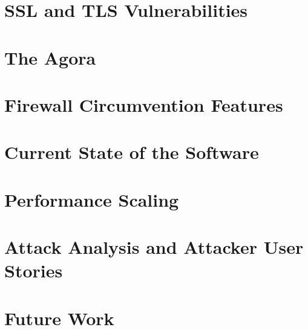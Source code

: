 \documentclass{article}
\begin{document}
\section{SSL and TLS Vulnerabilities}


\section{The Agora}
\label{sec:agora}



\section{Firewall Circumvention Features}
\label{sec:evasion}


\section{Current State of the Software}
\label{sec:current}


\section{Performance Scaling}
\label{sec:performance}


\section{Attack Analysis and Attacker User Stories}
\label{sec:attack-stories}


\section{Future Work}
\label{sec:future}


\printbibliography
\end{document}
